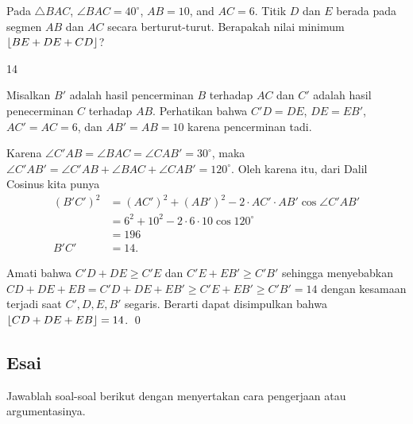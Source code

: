 \documentclass[12pt]{scrartcl}
\begin{document}
	\begin{soalbaru}
		Pada $\triangle BAC$, $\angle BAC = 40^\circ$, $AB=10$, and $AC=6$. Titik $D$ dan $E$ berada pada segmen $AB$ dan $AC$ secara berturut-turut. Berapakah nilai minimum $\left\lfloor BE+DE+CD \right\rfloor$?
		
		\begin{jawaban}
		14
		\end{jawaban}
		\begin{solusi}
		Misalkan $B'$ adalah hasil pencerminan $B$ terhadap $AC$ dan $C'$ adalah hasil penecerminan $C$ terhadap $AB$. Perhatikan bahwa $C'D=DE$, $DE=EB'$, $AC'=AC=6$, dan $AB'=AB=10$ karena pencerminan tadi. 
		
		Karena $\angle C'AB = \angle BAC = \angle CAB'=30^\circ$, maka $\angle C'AB' = \angle C'AB + \angle BAC + \angle CAB' = 120^\circ$. Oleh karena itu, dari Dalil Cosinus kita punya 
		\begin{align*}
		(B'C')^2 &= (AC')^2+(AB')^2-2\cdot AC' \cdot AB' \cos \angle C'AB'\\
		&= 6^2+10^2-2\cdot 6\cdot 10 \cos 120^\circ\\
		&= 196\\
		B'C' &= 14.
		\end{align*} 
		
		Amati bahwa $C'D+DE \ge C'E$ dan $C'E+EB' \ge C'B'$ sehingga menyebabkan \\$CD+DE+EB=C'D+DE+EB' \ge C'E +EB' \ge C'B'=14$ dengan kesamaan terjadi saat $C',D,E,B'$ segaris. Berarti dapat disimpulkan bahwa $\left\lfloor CD+DE+EB \right\rfloor=14$. \qed
		\end{solusi}
	\end{soalbaru}

\subsection{Esai}
Jawablah soal-soal berikut dengan menyertakan cara pengerjaan atau argumentasinya.
	
\end{document}
